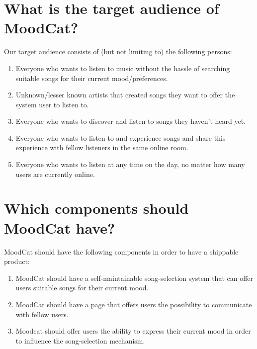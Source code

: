 \documentclass[10pt,a4paper]{article}
\begin{document}
\section{What is the target audience of MoodCat?}
Our target audience consists of (but not limiting to) the following persons:

\begin{enumerate}
\item Everyone who wants to listen to music without the hassle of searching suitable songs for their current mood/preferences.

\item Unknown/lesser known artists that created songs they want to offer the system user to listen to.

\item Everyone who wants to discover and listen to songs they haven't heard yet.

\item Everyone who wants to listen to and experience songs and share this experience with fellow listeners in the same online room.

\item Everyone who wants to listen at any time on the day, no matter how many users are currently online.
\end{enumerate}

\section{Which components should MoodCat have?}
MoodCat should have the following components in order to have a shippable product:

\begin{enumerate}
\item MoodCat should have a self-maintainable song-selection system that can offer users suitable songs for their current mood.

\item MoodCat should have a page that offers users the possibility to communicate with fellow users.

\item Moodcat should offer users the ability to express their current mood in order to influence the song-selection mechanism.
\end{enumerate}
\end{document}

